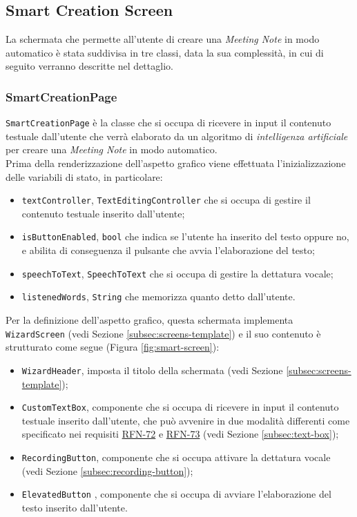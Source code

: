 \subsection{Smart Creation Screen}
\label{subsec:smart-creation-screen}

La schermata che permette all'utente di creare una \emph{Meeting Note} in modo automatico è stata suddivisa in tre classi, data la sua complessità, in cui di seguito verranno descritte nel dettaglio. 

\subsubsection*{SmartCreationPage}
\label{subsubsec:smart-creation-page}

\lstinline{SmartCreationPage} è la classe che si occupa di ricevere in input il contenuto testuale dall'utente che verrà elaborato da un algoritmo di \emph{intelligenza artificiale} per creare una \emph{Meeting Note} in modo automatico. \\
Prima della renderizzazione dell'aspetto grafico viene effettuata l'inizializzazione delle variabili di stato, in particolare:
\begin{itemize}
    \item \lstinline{textController}, \lstinline{TextEditingController} \cite{site:text-editing-controller} che si occupa di gestire il contenuto testuale inserito dall'utente;
    \item \lstinline{isButtonEnabled}, \lstinline{bool} che indica se l'utente ha inserito del testo oppure no, e abilita di conseguenza il pulsante che avvia l'elaborazione del testo;
    \item \lstinline{speechToText}, \lstinline{SpeechToText} \cite{site:speech-to-text} che si occupa di gestire la dettatura vocale;
    \item \lstinline{listenedWords}, \lstinline{String} che memorizza quanto detto dall'utente.
\end{itemize}
Per la definizione dell'aspetto grafico, questa schermata implementa \lstinline{WizardScreen} (vedi Sezione \ref{subsec:screens-template}) e il suo contenuto è strutturato come segue (Figura \ref{fig:smart-screen}):
\begin{itemize}
    \item \lstinline{WizardHeader}, imposta il titolo della schermata (vedi Sezione \ref{subsec:screens-template});
    \item \lstinline{CustomTextBox}, componente che si occupa di ricevere in input il contenuto testuale inserito dall'utente, che può avvenire in due modalità differenti come specificato nei requisiti \hyperref[RFN-72]{RFN-72} e \hyperref[RFN-73]{RFN-73} (vedi Sezione \ref{subsec:text-box});
    \item \lstinline{RecordingButton}, componente che si occupa attivare la dettatura vocale (vedi Sezione \ref{subsec:recording-button});
    \item \lstinline{ElevatedButton} \cite{site:elevated-button}, componente che si occupa di avviare l'elaborazione del testo inserito dall'utente.
\end{itemize}
